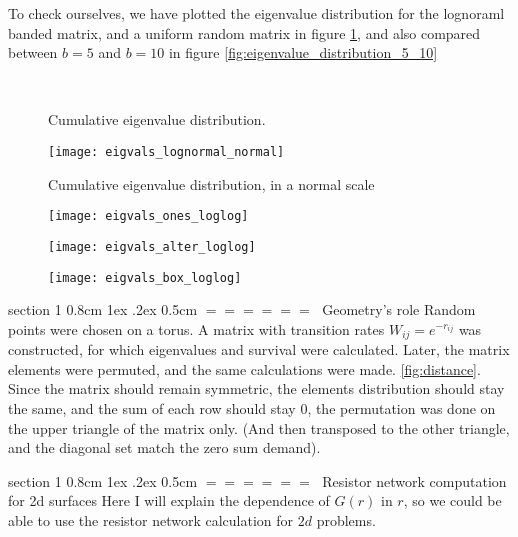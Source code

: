 \documentclass[onecolumn,fleqn,notitlepage,secnumarabic]{revtex4}
\makeatletter
\def\section{%
  \@startsection
    {section}%
    {1}%
    {\z@}%
    {0.8cm \@plus1ex \@minus .2ex}%
    {0.5cm}%
    {\Large\bf $=\!=\!=\!=\!=\!=\;$}%
}%
\makeatother
\begin{document}
To check ourselves, we have plotted the eigenvalue distribution for the lognoraml banded matrix, and a uniform random matrix in figure \ref{fig:eigenvalue_distribution}, and also compared between $b=5$ and $b=10$ in figure \ref{fig:eigenvalue_distribution_5_10}
\begin{figure}
    \\ 
    \caption{Cumulative eigenvalue distribution.}
    \label{fig:eigenvalue_distribution}
\end{figure}
\begin{figure}
    \texttt{[image: eigvals\_lognormal\_normal]}
    \caption{Cumulative eigenvalue distribution, in a normal scale}
\end{figure}
\begin{figure}
    \texttt{[image: eigvals\_ones\_loglog]}
\end{figure}
\begin{figure}
    \texttt{[image: eigvals\_alter\_loglog]}
\end{figure}
\begin{figure}
    \texttt{[image: eigvals\_box\_loglog]}
\end{figure}

\section{Geometry's role} \label{sec:geometry}
Random points were chosen on a torus. A matrix with transition rates $W_{ij} = e^{-r_{ij}}$ was constructed, for which eigenvalues and survival were calculated. Later, the matrix elements were permuted, and the same calculations were made. \ref{fig:distance}. Since the matrix should remain symmetric, the elements distribution should stay the same, and the sum of each row should stay $0$, the permutation was done on the upper triangle of the matrix only. (And then transposed to the other triangle, and the diagonal set match the zero sum demand).

\section{Resistor network computation for 2d surfaces}
Here I will explain the dependence of $G(r)$ in $r$, so we could be able to use the resistor network calculation for $2d$ problems.
\end{document}
